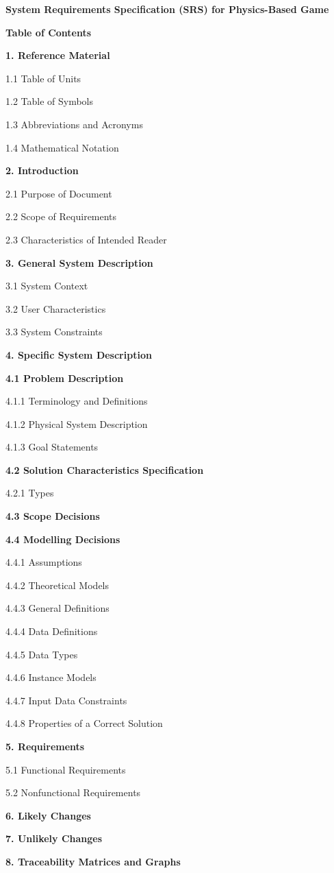 \documentclass[
]{article}
\author{}
\date{}
\begin{document}
\textbf{System Requirements Specification (SRS) for Physics-Based Game}

\textbf{Table of Contents}

\textbf{1. Reference Material}

1.1 Table of Units

1.2 Table of Symbols

1.3 Abbreviations and Acronyms

1.4 Mathematical Notation

\textbf{2. Introduction}

2.1 Purpose of Document

2.2 Scope of Requirements

2.3 Characteristics of Intended Reader

\textbf{3. General System Description}

3.1 System Context

3.2 User Characteristics

3.3 System Constraints

\textbf{4. Specific System Description}

\textbf{4.1 Problem Description}

4.1.1 Terminology and Definitions

4.1.2 Physical System Description

4.1.3 Goal Statements

\textbf{4.2 Solution Characteristics Specification}

4.2.1 Types

\textbf{4.3 Scope Decisions}

\textbf{4.4 Modelling Decisions}

4.4.1 Assumptions

4.4.2 Theoretical Models

4.4.3 General Definitions

4.4.4 Data Definitions

4.4.5 Data Types

4.4.6 Instance Models

4.4.7 Input Data Constraints

4.4.8 Properties of a Correct Solution

\textbf{5. Requirements}

5.1 Functional Requirements

5.2 Nonfunctional Requirements

\textbf{6. Likely Changes}

\textbf{7. Unlikely Changes}

\textbf{8. Traceability Matrices and Graphs}
\end{document}
